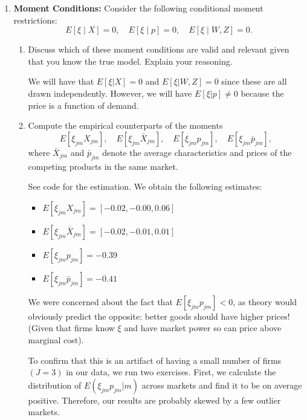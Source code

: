 \documentclass{article}
\begin{document}
\begin{enumerate}
\item \textbf{Moment Conditions:} Consider the following conditional moment restrictions:
\[
E[\xi \mid X ] = 0, \quad E[\xi \mid p ] = 0, \quad E[\xi \mid W, Z ] = 0.
\]
\begin{enumerate}
    \item Discuss which of these moment conditions are valid and relevant given that you know the true model. Explain your reasoning.
\begin{answer}

We will have that $E[\xi|X]=0$ and $E[\xi|W,Z]=0$ since these are all drawn independently. However, we will have $E[\xi|p]\neq 0$ because the price is a function of demand. 

\end{answer}
    
    \item  Compute the empirical counterparts of the moments
    \[
    E[\xi_{jm} X_{jm}], \quad E[\xi_{jm} \bar{X}_{jm}], \quad E[\xi_{jm} p_{jm}], \quad E[\xi_{jm} \bar{p}_{jm}],
    \]
    where $\bar{X}_{jm}$ and $\bar{p}_{jm}$ denote the average characteristics and prices of the competing products in the same market.
\begin{answer}

    See code for the estimation. We obtain the following estimates: 
    \begin{itemize}
        \item $E[\xi_{jm} X_{jm}] = [-0.02, -0.00,  0.06]$
        \item $E[\xi_{jm} \bar{X}_{jm}] = [-0.02, -0.01,  0.01]$
        \item $E[\xi_{jm} p_{jm}] = -0.39$
        \item $E[\xi_{jm} \bar{p}_{jm}] = -0.41$
        
    \end{itemize}

We were concerned about the fact that $E[\xi_{jm}p_{jm}]<0$, as theory would obviously predict the opposite: better goods should have higher prices! (Given that firms know $\xi$ and have market power so can price above marginal cost). 

To confirm that this is an artifact of having a small number of firms $(J=3)$ in our data, we run two exercises. First, we calculate the distribution of $E(\xi_{jm}p_{jm}|m)$  across markets and find it to be on average positive. Therefore, our results are probably skewed by a few outlier markets. 


\end{answer}
\end{enumerate}
\end{enumerate}
\end{document}
